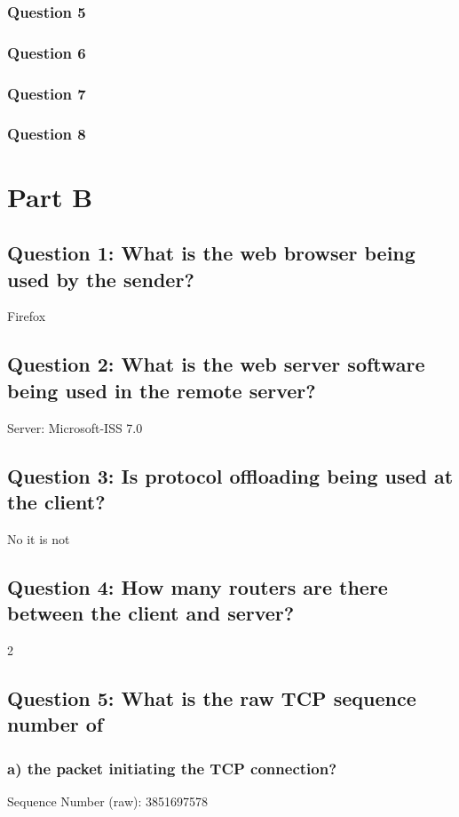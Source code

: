 \documentclass[11pt, oneside, a4paper]{article}
\begin{document}
\subsubsection*{Question 5}

\subsubsection*{Question 6}

\subsubsection*{Question 7}

\subsubsection*{Question 8}


\newpage
\section*{Part B}

\subsection*{Question 1: What is the web browser being used by the sender?}
Firefox

\subsection*{Question 2: What is the web server software being used in the remote server?}
Server: Microsoft-ISS 7.0

\subsection*{Question 3: Is protocol offloading being used at the client?}
No it is not

\subsection*{Question 4: How many routers are there between the client and server?}
2

\subsection*{Question 5: What is the raw TCP sequence number of}

  \subsubsection*{a) the packet initiating the TCP connection?}
  Sequence Number (raw): 3851697578
\end{document}
